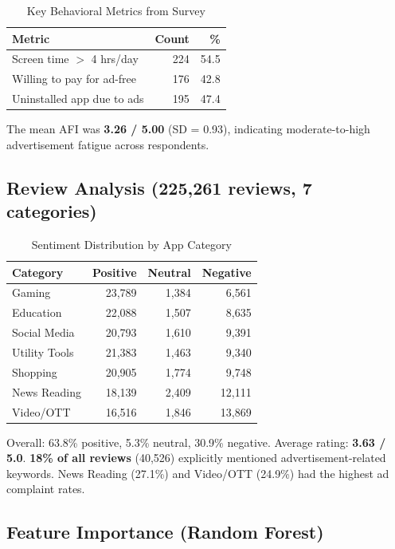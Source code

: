 \documentclass[12pt]{article}
\begin{document}
\begin{table}[H]
\centering
\begin{tabular}{lrr}
\toprule
\textbf{Metric} & \textbf{Count} & \textbf{\%} \\
\midrule
Screen time $>$ 4 hrs/day    & 224 & 54.5 \\
Willing to pay for ad-free   & 176 & 42.8 \\
Uninstalled app due to ads   & 195 & 47.4 \\
\bottomrule
\end{tabular}
\caption{Key Behavioral Metrics from Survey}
\end{table}

The mean AFI was \textbf{3.26 / 5.00} (SD = 0.93), indicating moderate-to-high advertisement fatigue across respondents.

\subsection{Review Analysis (225,261 reviews, 7 categories)}

\begin{table}[H]
\centering
\begin{tabular}{lrrr}
\toprule
\textbf{Category} & \textbf{Positive} & \textbf{Neutral} & \textbf{Negative} \\
\midrule
Gaming        & 23,789 & 1,384 & 6,561  \\
Education     & 22,088 & 1,507 & 8,635  \\
Social Media  & 20,793 & 1,610 & 9,391  \\
Utility Tools & 21,383 & 1,463 & 9,340  \\
Shopping      & 20,905 & 1,774 & 9,748  \\
News Reading  & 18,139 & 2,409 & 12,111 \\
Video/OTT     & 16,516 & 1,846 & 13,869 \\
\bottomrule
\end{tabular}
\caption{Sentiment Distribution by App Category}
\end{table}

Overall: 63.8\% positive, 5.3\% neutral, 30.9\% negative. Average rating: \textbf{3.63 / 5.0}. \textbf{18\% of all reviews} (40,526) explicitly mentioned advertisement-related keywords. News Reading (27.1\%) and Video/OTT (24.9\%) had the highest ad complaint rates.

\subsection{Feature Importance (Random Forest)}
\end{document}
